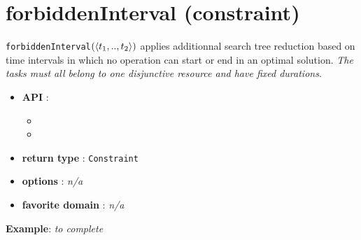 \section{forbiddenInterval (constraint)}\label{forbiddeninterval:forbiddenintervalconstraint}\hypertarget{forbiddeninterval:forbiddenintervalconstraint}{}

\begin{notedef}
  \texttt{forbiddenInterval}$(\langle t_1,..,t_2\rangle)$ applies additionnal search tree reduction based on time intervals in which no operation can start or end in an optimal solution. \emph{The tasks must all belong to one disjunctive resource and have fixed durations}.
\end{notedef}

\begin{itemize}
	\item \textbf{API} :
	\begin{itemize}
		\item {}
		\item {}
	\end{itemize}
	\item \textbf{return type} : \texttt{Constraint}
	\item \textbf{options} : \emph{n/a}
	\item \textbf{favorite domain} : \emph{n/a}
\end{itemize}

\textbf{Example}:
\emph{to complete}
%

